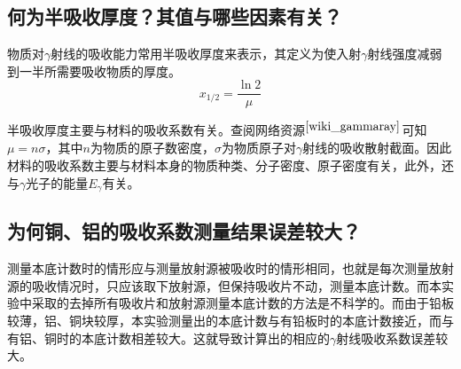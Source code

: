 \documentclass[a4paper]{article}
\begin{document}
\subsection{何为半吸收厚度？其值与哪些因素有关？}
物质对$\gamma$射线的吸收能力常用半吸收厚度来表示，其定义为使入射$\gamma$射线强度减弱到一半所需要吸收物质的厚度。
\begin{equation}
x_{1/2} = \frac{\ln 2}{\mu}
\end{equation}

半吸收厚度主要与材料的吸收系数有关。查阅网络资源$^{\cite{wiki_gammaray}}$可知$\mu = n\sigma$，其中$n$为物质的原子数密度，$\sigma$为物质原子对$\gamma$射线的吸收散射截面。因此材料的吸收系数主要与材料本身的物质种类、分子密度、原子密度有关，此外，还与$\gamma$光子的能量$E_{\gamma}$有关。

\subsection{为何铜、铝的吸收系数测量结果误差较大？}
测量本底计数时的情形应与测量放射源被吸收时的情形相同，也就是每次测量放射源的吸收情况时，只应该取下放射源，但保持吸收片不动，测量本底计数。而本实验中采取的去掉所有吸收片和放射源测量本底计数的方法是不科学的。而由于铅板较薄，铝、铜块较厚，本实验测量出的本底计数与有铅板时的本底计数接近，而与有铝、铜时的本底计数相差较大。这就导致计算出的相应的$\gamma$射线吸收系数误差较大。

\nocite{jiaocai}

\end{document}
